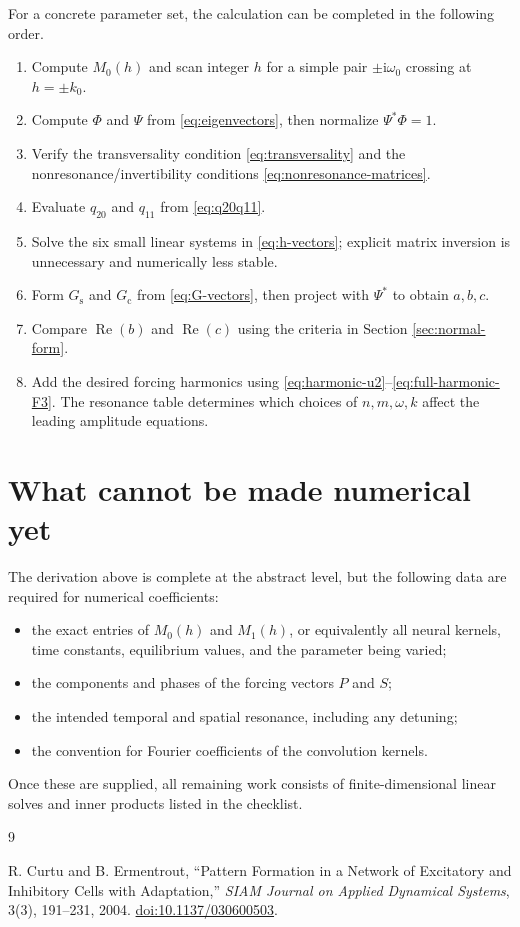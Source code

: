\documentclass[11pt]{article}
\newcommand{\ii}{\mathrm{i}}
\DeclareMathOperator{\RePart}{Re}
\begin{document}
For a concrete parameter set, the calculation can be completed in the
following order.
\begin{enumerate}[label=\arabic*.]
  \item Compute $M_0(h)$ and scan integer $h$ for a simple pair
  $\pm\ii\omega_0$ crossing at $h=\pm k_0$.
  \item Compute $\Phi$ and $\Psi$ from \eqref{eq:eigenvectors}, then normalize
  $\Psi^*\Phi=1$.
  \item Verify the transversality condition \eqref{eq:transversality} and the
  nonresonance/invertibility conditions \eqref{eq:nonresonance-matrices}.
  \item Evaluate $q_{20}$ and $q_{11}$ from \eqref{eq:q20q11}.
  \item Solve the six small linear systems in \eqref{eq:h-vectors}; explicit
  matrix inversion is unnecessary and numerically less stable.
  \item Form $G_{\mathrm{s}}$ and $G_{\mathrm{c}}$ from
  \eqref{eq:G-vectors}, then project with $\Psi^*$ to obtain $a,b,c$.
  \item Compare $\RePart(b)$ and $\RePart(c)$ using the criteria in
  Section \ref{sec:normal-form}.
  \item Add the desired forcing harmonics using
  \eqref{eq:harmonic-u2}--\eqref{eq:full-harmonic-F3}.  The resonance table
  determines which choices of $n,m,\omega,k$ affect the leading amplitude
  equations.
\end{enumerate}

\section{What cannot be made numerical yet}

The derivation above is complete at the abstract level, but the following data
are required for numerical coefficients:
\begin{itemize}
  \item the exact entries of $M_0(h)$ and $M_1(h)$, or equivalently all neural
  kernels, time constants, equilibrium values, and the parameter being varied;
  \item the components and phases of the forcing vectors $P$ and $S$;
  \item the intended temporal and spatial resonance, including any detuning;
  \item the convention for Fourier coefficients of the convolution kernels.
\end{itemize}
Once these are supplied, all remaining work consists of finite-dimensional
linear solves and inner products listed in the checklist.

\begin{thebibliography}{9}

R. Curtu and B. Ermentrout,
``Pattern Formation in a Network of Excitatory and Inhibitory Cells with
Adaptation,''
\emph{SIAM Journal on Applied Dynamical Systems}, 3(3), 191--231, 2004.
\href{https://doi.org/10.1137/030600503}{doi:10.1137/030600503}.

\end{thebibliography}
\end{document}
